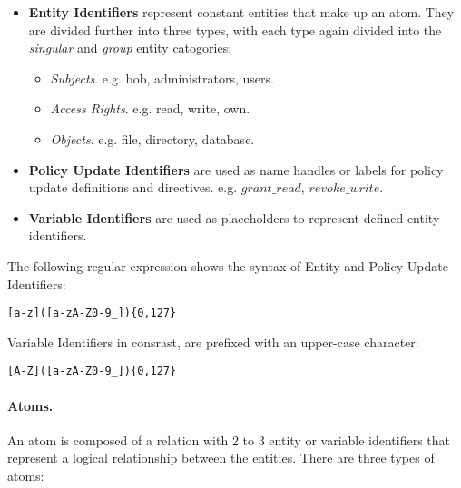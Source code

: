 \documentclass{llncs}
\begin{document}
          \begin{itemize}
            \item
              {\bf Entity Identifiers} represent constant entities that make
              up an atom. They are divided further into three types, with each
              type again divided into the {\em singular} and {\em group} entity
              catogories:
 
              \begin{itemize}
                \item
                  {\em Subjects}. e.g. bob, administrators, users.
                \item
                  {\em Access Rights}. e.g. read, write, own.
                \item
                  {\em Objects}. e.g. file, directory, database.
              \end{itemize}
            \vspace{1mm}
            \item
              {\bf Policy Update Identifiers} are used as name handles or
              labels for policy update definitions and directives. e.g.
              $grant\_read$, $revoke\_write$.
 
            \vspace{1mm}
            \item
              {\bf Variable Identifiers} are used as placeholders to represent
              defined entity identifiers.
          \end{itemize}
 
          The following regular expression shows the syntax of Entity and
          Policy Update Identifiers:
 
          \begin{verbatim}[a-z]([a-zA-Z0-9_]){0,127}\end{verbatim}
 
          Variable Identifiers in consrast, are prefixed with an upper-case
          character:
 
          \begin{verbatim}[A-Z]([a-zA-Z0-9_]){0,127}\end{verbatim}

        \paragraph{\bf Atoms.}
          An atom is composed of a relation with 2 to 3 entity or variable
          identifiers that represent a logical relationship between the
          entities. There are three types of atoms:
\end{document}

